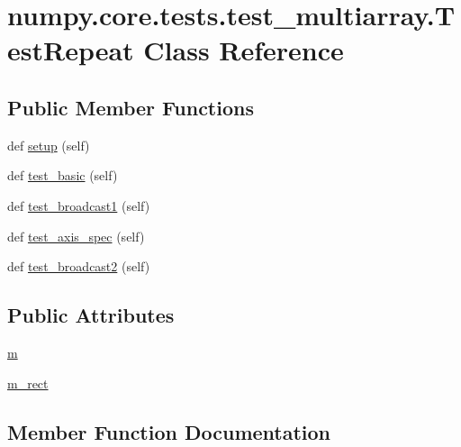 \hypertarget{classnumpy_1_1core_1_1tests_1_1test__multiarray_1_1TestRepeat}{}\section{numpy.\+core.\+tests.\+test\+\_\+multiarray.\+Test\+Repeat Class Reference}
\label{classnumpy_1_1core_1_1tests_1_1test__multiarray_1_1TestRepeat}
\subsection*{Public Member Functions}
\begin{DoxyCompactItemize}
\item 
def \hyperlink{classnumpy_1_1core_1_1tests_1_1test__multiarray_1_1TestRepeat_a19aa9439c44f8aeda585763253879743}{setup} (self)
\item 
def \hyperlink{classnumpy_1_1core_1_1tests_1_1test__multiarray_1_1TestRepeat_ac1a237c18a3312c21f963299683c559e}{test\+\_\+basic} (self)
\item 
def \hyperlink{classnumpy_1_1core_1_1tests_1_1test__multiarray_1_1TestRepeat_a704db6c3596fe166bcde60a44544ba66}{test\+\_\+broadcast1} (self)
\item 
def \hyperlink{classnumpy_1_1core_1_1tests_1_1test__multiarray_1_1TestRepeat_afda5ac4254732490f93250116aece444}{test\+\_\+axis\+\_\+spec} (self)
\item 
def \hyperlink{classnumpy_1_1core_1_1tests_1_1test__multiarray_1_1TestRepeat_a766e2ecf9bfb64b71db9683473e5ab2e}{test\+\_\+broadcast2} (self)
\end{DoxyCompactItemize}
\subsection*{Public Attributes}
\begin{DoxyCompactItemize}
\item 
\hyperlink{classnumpy_1_1core_1_1tests_1_1test__multiarray_1_1TestRepeat_a114942d9d70ee15ef06f84a2b3ee469b}{m}
\item 
\hyperlink{classnumpy_1_1core_1_1tests_1_1test__multiarray_1_1TestRepeat_ae42ab208d0d4ff18bee8e8723d081503}{m\+\_\+rect}
\end{DoxyCompactItemize}


\subsection{Member Function Documentation}
\mbox{\label{classnumpy_1_1core_1_1tests_1_1test__multiarray_1_1TestRepeat_a19aa9439c44f8aeda585763253879743}} 
